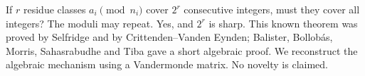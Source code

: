 If $r$ residue classes $a_i\pmod{n_i}$ cover $2^r$ consecutive integers, must they cover all integers? The moduli may repeat. Yes, and $2^r$ is sharp. This known theorem was proved by Selfridge and by Crittenden--Vanden Eynden; Balister, Bollob\'as, Morris, Sahasrabudhe and Tiba gave a short algebraic proof. We reconstruct the algebraic mechanism using a Vandermonde matrix. No novelty is claimed.
